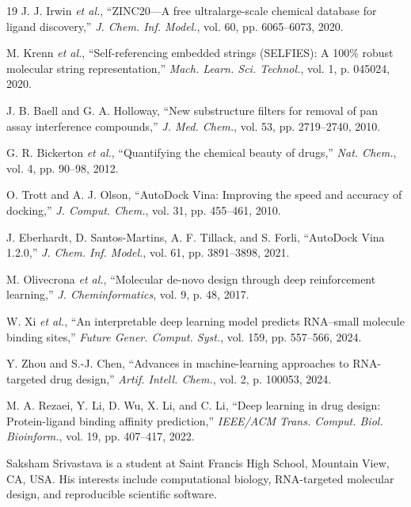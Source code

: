 \documentclass[journal]{IEEEtran}
\begin{document}
\begin{thebibliography}{19}
J. J. Irwin \emph{et al.}, ``ZINC20---A free ultralarge-scale chemical
database for ligand discovery,'' \emph{J. Chem. Inf. Model.}, vol. 60,
pp. 6065--6073, 2020.

M. Krenn \emph{et al.}, ``Self-referencing embedded strings (SELFIES):
A 100\% robust molecular string representation,'' \emph{Mach. Learn.
Sci. Technol.}, vol. 1, p. 045024, 2020.

J. B. Baell and G. A. Holloway, ``New substructure filters for removal
of pan assay interference compounds,'' \emph{J. Med. Chem.}, vol. 53,
pp. 2719--2740, 2010.

G. R. Bickerton \emph{et al.}, ``Quantifying the chemical beauty of
drugs,'' \emph{Nat. Chem.}, vol. 4, pp. 90--98, 2012.

O. Trott and A. J. Olson, ``AutoDock Vina: Improving the speed and
accuracy of docking,'' \emph{J. Comput. Chem.}, vol. 31,
pp. 455--461, 2010.

J. Eberhardt, D. Santos-Martins, A. F. Tillack, and S. Forli,
``AutoDock Vina 1.2.0,'' \emph{J. Chem. Inf. Model.}, vol. 61,
pp. 3891--3898, 2021.

M. Olivecrona \emph{et al.}, ``Molecular de-novo design through deep
reinforcement learning,'' \emph{J. Cheminformatics}, vol. 9, p. 48,
2017.

W. Xi \emph{et al.}, ``An interpretable deep learning model predicts
RNA--small molecule binding sites,'' \emph{Future Gener. Comput. Syst.},
vol. 159, pp. 557--566, 2024.

Y. Zhou and S.-J. Chen, ``Advances in machine-learning approaches to
RNA-targeted drug design,'' \emph{Artif. Intell. Chem.}, vol. 2,
p. 100053, 2024.

M. A. Rezaei, Y. Li, D. Wu, X. Li, and C. Li, ``Deep learning in drug
design: Protein-ligand binding affinity prediction,'' \emph{IEEE/ACM
Trans. Comput. Biol. Bioinform.}, vol. 19, pp. 407--417, 2022.

\end{thebibliography}

\begin{IEEEbiographynophoto}{Saksham Srivastava}
is a student at Saint Francis High School, Mountain View, CA, USA. His
interests include computational biology, RNA-targeted molecular design,
and reproducible scientific software.
\end{IEEEbiographynophoto}
\end{document}
